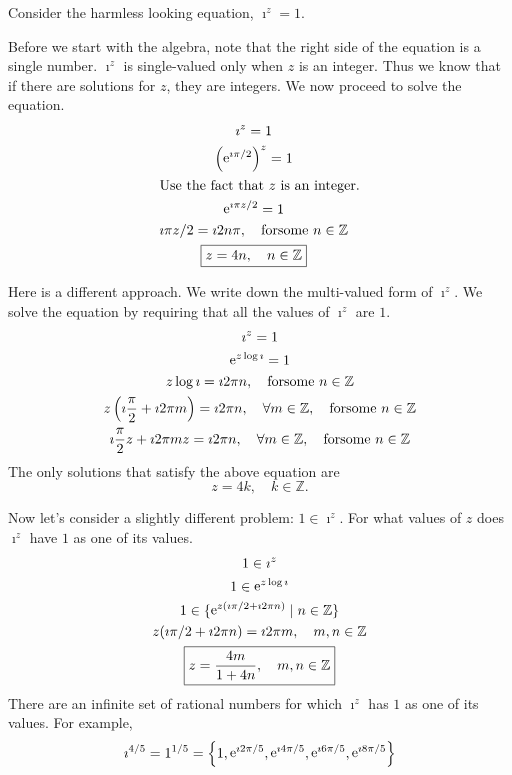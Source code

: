 \begin{Example}
  Consider the harmless looking equation, $\imath^z = 1$.

  Before we start with the algebra, note that the right side of the equation
  is a single number.  $\imath^z$ is single-valued only when $z$ is an integer.
  Thus we know that if there are solutions for $z$, they are integers.
  We now proceed to solve the equation.
  \begin{gather*}
    \imath^z = 1 
    \\
    \left( \mathop{\mathrm{e}}\nolimits^{\imath \pi / 2} \right)^z = 1 
    \\
    \intertext{Use the fact that $z$ is an integer.}
    \mathop{\mathrm{e}}\nolimits^{\imath \pi z / 2} = 1 
    \\
    \imath \pi z / 2 = \imath 2 n \pi, \quad \mathrm{for some}\ n \in \mathbb{Z} 
    \\
    \boxed{
      z = 4 n, \quad n \in \mathbb{Z}
      }
  \end{gather*}

  Here is a different approach.  We write down the multi-valued form of $\imath^z$.
  We solve the equation by requiring that all the values of $\imath^z$ are $1$.
  \begin{gather*}
    \imath^z = 1 
    \\
    \mathop{\mathrm{e}}\nolimits^{z \log \imath} = 1 
    \\
    z \log \imath = \imath 2 \pi n, \quad \mathrm{for some}\ n \in \mathbb{Z} 
    \\
    z \left( \imath \frac{\pi}{2} + \imath 2 \pi m \right) = \imath 2 \pi n, \quad \forall 
    m \in \mathbb{Z}, \quad \mathrm{for some}\ n \in \mathbb{Z} 
    \\
    \imath \frac{\pi}{2} z + \imath 2 \pi m z = \imath 2 \pi n, \quad \forall m \in \mathbb{Z},
    \quad \mathrm{for some}\ n \in \mathbb{Z} 
  \end{gather*}
  The only solutions that satisfy the above equation are
  \[
  \boxed{
    z = 4 k, \quad k \in \mathbb{Z}.
    }
  \]

  Now let's consider a slightly different problem: $1 \in \imath^z$.  
  For what values of $z$ does $\imath^z$ have $1$ as one of its values.
  \begin{gather*}
    1 \in \imath^z 
    \\
    1 \in \mathop{\mathrm{e}}\nolimits^{z \log \imath} 
    \\
    1 \in \{ \mathop{\mathrm{e}}\nolimits^{z (\imath \pi / 2 + \imath 2 \pi n)} \mid n \in \mathbb{Z} \} 
    \\
    z (\imath \pi / 2 + \imath 2 \pi n) = \imath 2 \pi m, \quad m,n \in \mathbb{Z} 
    \\
    \boxed{
      z = \frac{4 m}{1 + 4 n}, \quad m,n \in \mathbb{Z}
      }
  \end{gather*}
  There are an infinite set of rational numbers for which $\imath^z$ has $1$ as one
  of its values.  For example,
  \[
  \imath^{4/5} = 1^{1/5} =
  \left\{ 1, \mathop{\mathrm{e}}\nolimits^{\imath 2 \pi / 5}, \mathop{\mathrm{e}}\nolimits^{\imath 4 \pi / 5}, \mathop{\mathrm{e}}\nolimits^{\imath 6 \pi / 5}, \mathop{\mathrm{e}}\nolimits^{\imath 8 \pi / 5} \right\}
  \]
\end{Example}
